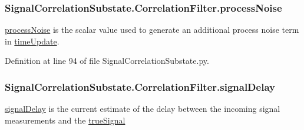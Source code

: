 \subsubsection[{\texorpdfstring{process\+Noise}{processNoise}}]{\setlength{\rightskip}{0pt plus 5cm}Signal\+Correlation\+Substate.\+Correlation\+Filter.\+process\+Noise}\hypertarget{classSignalCorrelationSubstate_1_1CorrelationFilter_abbd9598dd2d237abb1eef86ba427da7f}{}\label{classSignalCorrelationSubstate_1_1CorrelationFilter_abbd9598dd2d237abb1eef86ba427da7f}


\hyperlink{classSignalCorrelationSubstate_1_1CorrelationFilter_abbd9598dd2d237abb1eef86ba427da7f}{process\+Noise} is the scalar value used to generate an additional process noise term in \hyperlink{classSignalCorrelationSubstate_1_1CorrelationFilter_a07a8c37a30c3d0a057049e0ff2eac67f}{time\+Update}. 



Definition at line 94 of file Signal\+Correlation\+Substate.\+py.

\subsubsection[{\texorpdfstring{signal\+Delay}{signalDelay}}]{\setlength{\rightskip}{0pt plus 5cm}Signal\+Correlation\+Substate.\+Correlation\+Filter.\+signal\+Delay}\hypertarget{classSignalCorrelationSubstate_1_1CorrelationFilter_a01e35890dee1d79bd0e4f9e82cb16e3f}{}\label{classSignalCorrelationSubstate_1_1CorrelationFilter_a01e35890dee1d79bd0e4f9e82cb16e3f}


\hyperlink{classSignalCorrelationSubstate_1_1CorrelationFilter_a01e35890dee1d79bd0e4f9e82cb16e3f}{signal\+Delay} is the current estimate of the delay between the incoming signal measurements and the \hyperlink{classSignalCorrelationSubstate_1_1CorrelationFilter_a67ff75effd8a8a7e34f0f3e8c56ef491}{true\+Signal} 



